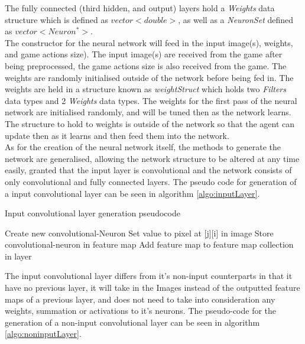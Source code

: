 \documentclass[10pt]{article}
\begin{document}
	The fully connected (third hidden, and output) layers hold a \textit{Weights} data structure which is defined as $vector<double>$, as well as a \textit{NeuronSet} defined as $vector<Neuron^*>$.\\
	
	The constructor for the neural network will feed in the input image(s), weights, and game actions size). The input image(s) are received from the game after being preprocessed, the game actions size is also received from the game. The weights are randomly initialised outside of the network before being fed in. The weights are held in a structure known as \textit{weightStruct} which holds two \textit{Filters} data types and 2 \textit{Weights} data types. The weights for the first pass of the neural network are initialised randomly, and will be tuned then as the network learns. The structure to hold to weights is outside of the network so that the agent can update then as it learns and then feed them into the network.\\
	
	As for the creation of the neural network itself, the methods to generate the network are generalised, allowing the network structure to be altered at any time easily, granted that the input layer is convolutional and the network consists of only convolutional and fully connected layers. The pseudo code for generation of a input convolutional layer can be seen in algorithm \ref{algo:inputLayer}.\\
		
		\begin{algorithm}[h]
			\caption{Input convolutional layer generation pseudocode}
			\label{algo:inputLayer}
			\begin{algorithmic}[1]
							\State Create new convolutional-Neuron
							\State Set value to pixel at [j][i] in image
							\State Store convolutional-neuron in feature map
						\EndFor
					\EndFor
					\State Add feature map to feature map collection in layer
				\EndFor
				\EndProcedure
			\end{algorithmic}
		\end{algorithm}
		
		The input convolutional layer differs from it's non-input counterparts in that it have no previous layer, it will take in the Images instead of the outputted feature maps of a previous layer, and does not need to take into consideration any weights, summation or activations to it's neurons. The pseudo-code for the generation of a non-input convolutional layer can be seen in algorithm \ref{algo:noninputLayer}.\\
		
\end{document}
